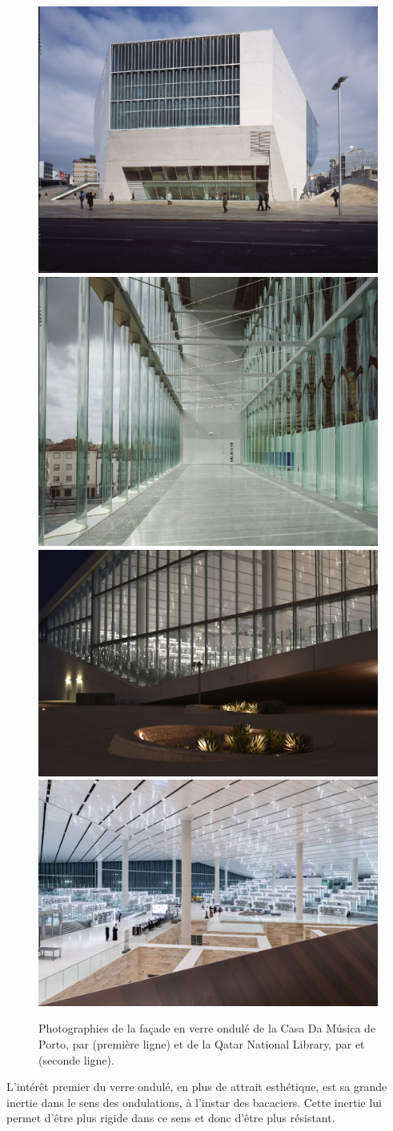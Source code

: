 \documentclass[11pt,titlepage]{article}
\begin{document}
\begin{figure}[H]
    \centering
    \includegraphics[height=0.392\textwidth]{img/ondul/casa_musica4 (1).jpg}\hfill
    \includegraphics[height=0.392\textwidth]{img/ondul/casa_musica1 (1).jpg}
    \\[\smallskipamount]
    \includegraphics[height=0.331\textwidth]{img/ondul/02_Qatar_National_Library__Photo_by_Hans_Werlemann_4180.jpg}\hfill
    \includegraphics[height=0.331\textwidth]{img/ondul/07_Qatar_National_Library__Photo_by_Iwan_Baan_5345.jpg}
    \caption{Photographies de la façade en verre ondulé de la Casa Da Música de Porto, par \cite{CasaDaMusica} (première ligne) et de la Qatar National Library, par \cite{quatNatLib} et \cite{quatNatLib2} (seconde ligne).}
    \label{fig:CasaDaMusica}
\end{figure}
L'intérêt premier du verre ondulé, en plus de attrait esthétique, est sa grande inertie dans le sens des ondulations, à l'instar des bacaciers. Cette inertie lui permet d'être plus rigide dans ce sens et donc d'être plus résistant.
\end{document}
